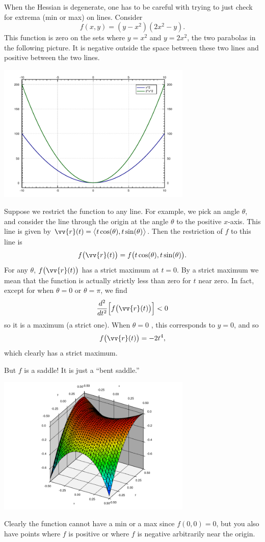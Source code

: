 \documentclass[12pt]{article}
\begin{document}
When the Hessian is degenerate,
one has to be careful with trying to just check for extrema (min or max) on
lines.  Consider
\[
f(x,y) = (y-x^2)(2x^2-y) .
\]
This function is zero on the sets where $y=x^2$ and $y=2x^2$, the two
parabolas in the following picture.  It is negative outside the space
between these two lines and positive between the two lines.
\begin{center}
\includegraphics[width=3.65in]{peanocurves}
\end{center}
Suppose we restrict the function to any line. For example, we pick an angle
$\theta$, and consider the line through the origin at the angle 
$\theta$ to the positive $x$-axis.
This line is given by $\vv{r}(t) = \bigl\langle t \cos(\theta),t
\sin(\theta)\bigr\rangle$.  Then the restriction of $f$ to this line is
\[
f\bigl(\vv{r}(t)\bigr) = f\bigl(t\cos(\theta),t\sin (\theta)\bigr) .
\]
For any $\theta$, $f\bigl(\vv{r}(t)\bigr)$ has a strict maximum at $t=0$.
By a strict maximum we mean that the function is actually
strictly less than zero for $t$ near zero.
In fact, except for when $\theta=0$ or $\theta=\pi$, we find
\[
\frac{d^2}{dt^2} \Bigl[ f \bigl( \vv{r}(t) \bigr) \Bigr] < 0
\]
so it is a maximum (a strict one).  When $\theta = 0$ , this corresponds to
$y=0$, and so
\[
f \bigl( \vv{r}(t) \bigr) = -2t^4 ,
\]
which clearly has a strict maximum.

But $f$ is a saddle!  It is just a ``bent saddle.''
\begin{center}
\includegraphics[width=3.65in]{peanosurface}
\end{center}
Clearly the function cannot have a min or a max since $f(0,0)=0$, but you
also have points where $f$ is positive or where $f$ is negative arbitrarily
near the origin.
\end{document}
